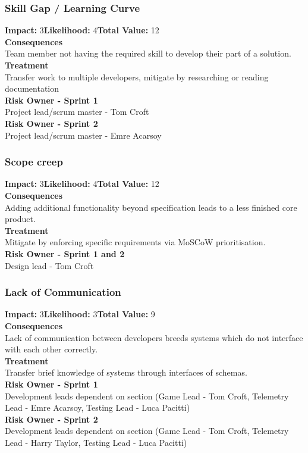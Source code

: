 \documentclass[11pt]{article}
\begin{document}
\subsubsection{Skill Gap / Learning Curve}
\textbf{Impact:} 3\quad \textbf{Likelihood:} 4\quad \textbf{Total Value:} 12\\
\textbf{Consequences}\\
Team member not having the required skill to develop their part of a solution.\\
\textbf{Treatment}\\
Transfer work to multiple developers, mitigate by researching or reading documentation\\
\textbf{Risk Owner - Sprint 1}\\
Project lead/scrum master - Tom Croft\\
\textbf{Risk Owner - Sprint 2}\\
Project lead/scrum master - Emre Acarsoy
\subsubsection{Scope creep}
\textbf{Impact:} 3\quad \textbf{Likelihood:} 4\quad \textbf{Total Value:} 12\\
\textbf{Consequences}\\
Adding additional functionality beyond specification leads to a less finished core product.\\
\textbf{Treatment}\\
Mitigate by enforcing specific requirements via MoSCoW prioritisation.\\
\textbf{Risk Owner - Sprint 1 and 2}\\
Design lead - Tom Croft
\subsubsection{Lack of Communication}
\textbf{Impact:} 3\quad \textbf{Likelihood:} 3\quad \textbf{Total Value:} 9\\
\textbf{Consequences}\\
Lack of communication between developers breeds systems which do not interface with each other correctly.\\
\textbf{Treatment}\\
Transfer brief knowledge of systems through interfaces of schemas.\\
\textbf{Risk Owner - Sprint 1}\\
Development leads dependent on section (Game Lead - Tom Croft, Telemetry Lead - Emre Acarsoy, Testing Lead - Luca Pacitti)\\
\textbf{Risk Owner - Sprint 2}\\
Development leads dependent on section (Game Lead - Tom Croft, Telemetry Lead - Harry Taylor, Testing Lead - Luca Pacitti)\\
\end{document}
